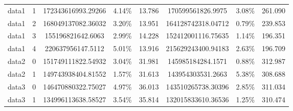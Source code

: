 \begin{table}[h!tbp]
\begin{tabular}{|c|c||c|c|c||c|c|c|}
        data1                                     & 1                                                                         & 172343616993.29266                                              & 4.14\%       & 13.786              & 170599561826.9975  & 3.08\%       & 261.090             \\
        data1                                     & 2                                                                         & 168049137082.36032                                              & 3.20\%       & 13.951              & 164128742318.04712 & 0.79\%       & 239.853             \\
        data1                                     & 3                                                                         & 155196821642.6063                                               & 2.99\%       & 14.228              & 152412001116.75635 & 1.14\%       & 196.351             \\
        data1                                     & 4                                                                         & 220637956147.5112                                               & 5.01\%       & 13.916              & 215629243400.94183 & 2.63\%       & 196.709             \\
        \hline
        data2                                     & 0                                                                         & 151749111822.54932                                              & 3.04\%       & 31.981              & 145985184284.1571  & 0.88\%       & 312.987             \\
        data2                                     & 1                                                                         & 149743938404.81552                                              & 1.57\%       & 31.613              & 143954303531.2663  & 5.38\%       & 308.688             \\
        \hline
        data3                                     & 0                                                                         & 146470880322.75027                                              & 4.97\%       & 36.013              & 143510265738.30396 & 2.85\%       & 311.034             \\
        data3                                     & 1                                                                         & 134996113638.58527                                              & 3.54\%       & 35.814              & 132015833610.36536 & 1.25\%       & 310.474             \\

\end{tabular}
\end{table}
